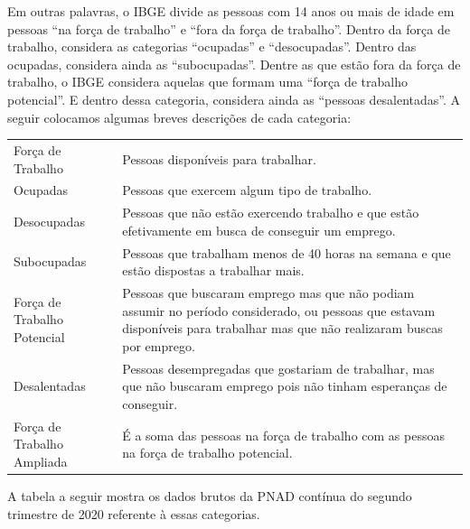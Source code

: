 Em outras palavras, o IBGE divide as pessoas com 14 anos ou mais de idade em pessoas “na força de trabalho”{} e “fora da força de trabalho”. Dentro da força de trabalho, considera as categorias “ocupadas”{} e “desocupadas”. Dentro das ocupadas, considera ainda as “subocupadas”. Dentre as que estão fora da força de trabalho, o IBGE considera aquelas que formam uma “força de trabalho potencial”. E dentro dessa categoria, considera ainda as “pessoas desalentadas”.
\clearpage
A seguir colocamos algumas breves descrições de cada categoria:

\begin{table}[H]
\centering
\begin{tabu} to 
\hline
{} &  \\
\hline
Força de Trabalho & Pessoas disponíveis para trabalhar. \\
\hline
Ocupadas & Pessoas que exercem algum tipo de trabalho. \\
\hline
Desocupadas & Pessoas que não estão exercendo trabalho e que estão efetivamente em busca de conseguir um emprego. \\
\hline
Subocupadas & Pessoas que trabalham menos de 40 horas na semana e que estão dispostas a trabalhar mais. \\
\hline
Força de Trabalho Potencial & Pessoas que buscaram emprego mas que não podiam assumir no período considerado, ou pessoas que estavam disponíveis para trabalhar mas que não realizaram buscas por emprego. \\
\hline
Desalentadas & Pessoas desempregadas que gostariam de trabalhar, mas que não buscaram emprego pois não tinham esperanças de conseguir. \\
\hline
Força de Trabalho Ampliada & É a soma das pessoas na força de trabalho com as pessoas na força de trabalho potencial. \\
\hline
\end{tabu}
\end{table}

A tabela a seguir mostra os dados brutos da PNAD contínua do segundo trimestre de 2020 referente à essas categorias.

